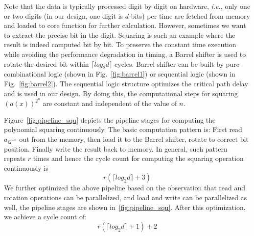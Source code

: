 \documentclass[runningheads]{llncs}
\begin{document}
Note that the data is typically processed digit by digit on hardware, \textit{i.e.}, only one or two digits (in our design, one digit is $d$-bits) per time are fetched from memory and loaded to core function for further calculation. However, sometimes we want to extract the precise bit in the digit.
Squaring is such an example where the result is indeed computed bit by bit. To preserve the constant time execution while
avoiding the performance degradation in timing,
a Barrel shifter
is used to rotate the desired bit within $\lceil log_2d\rceil$ cycles. Barrel shifter can be built by pure combinational logic (shown in Fig.~\ref{fig:barrel1}) or sequential logic (shown in Fig.~\ref{fig:barrel2}). The sequential logic structure optimizes the critical path delay and is used in our design. By doing this, the computational steps for squaring $(a(x))^{2^n}$ are constant and independent of the value of $n$.

Figure~\ref{fig:pipeline_squ} depicts the pipeline stages for computing the
polynomial squaring continuously.
The basic computation pattern is:
First read $a_{i2^{-n}}$ out from the memory,
then load it to the Barrel shifter, rotate to correct bit position.
Finally write the result back to memory.
In general, such pattern repeats $r$ times and
hence the cycle count for computing the squaring operation continuously is
\[
    r(\lceil log_2d\rceil+3)
\]
We further optimized the above pipeline based on the observation
that read and rotation operations can be parallelized,
and load and write can be parallelized as well,
the pipeline stages are shown in~\ref{fig:pipeline_squ}.
After this optimization, we achieve a cycle count of:
\[
    r(\lceil log_2d\rceil+1)+2
\]
\end{document}
